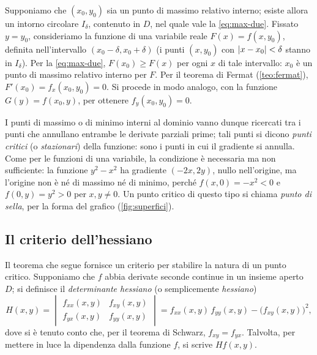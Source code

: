 \begin{dimostrazione}
Supponiamo che $(x_{0},y_{0})$ sia un punto di massimo relativo interno; esiste allora un
intorno circolare $I_{\delta}$, contenuto in $D$, nel quale vale la \eqref{eq:max-due}.
Fissato $y=y_{0}$, consideriamo la funzione di una variabile reale
$F(x)=f(x,y_{0})$, definita nell'intervallo $(x_{0}-\delta,x_{0}+\delta)$ (i punti
$(x,y_{0})$ con $\lvert x-x_{0}\rvert<\delta$ stanno in $I_{\delta}$). Per la \eqref{eq:max-due},
$F(x_{0})\ge F(x)$ per ogni $x$ di tale intervallo: $x_{0}$ è un punto di massimo
relativo interno per $F$. Per il teorema di Fermat (\cref{teo:fermat}),
$F'(x_{0})=f_{x}(x_{0},y_{0})=0$. Si procede in modo analogo, con la funzione
$G(y)=f(x_{0},y)$, per ottenere $f_{y}(x_{0},y_{0})=0$.
\end{dimostrazione}

I punti di massimo o di minimo interni al dominio vanno dunque ricercati tra i punti che
annullano entrambe le derivate parziali prime; tali punti si dicono \emph{punti critici}
(o \emph{stazionari}) della funzione: sono i punti in cui il gradiente si annulla. Come
per le funzioni di una variabile, la condizione è necessaria ma non sufficiente: la
funzione $y^{2}-x^{2}$ ha gradiente $(-2x,2y)$, nullo nell'origine, ma l'origine non è né
di massimo né di minimo, perché $f(x,0)=-x^{2}<0$ e $f(0,y)=y^{2}>0$ per $x,y\neq0$. Un
punto critico di questo tipo si chiama \emph{punto di sella}, per la forma del grafico
(\cref{fig:superfici}).

\subsection{Il criterio dell'hessiano}

Il teorema che segue fornisce un criterio per stabilire la natura di un punto critico.
Supponiamo che $f$ abbia derivate seconde continue in un insieme aperto $D$; si definisce
il \emph{determinante hessiano} (o semplicemente \emph{hessiano})
\begin{equation}\label{eq:hessiano}
  H(x,y)=\begin{vmatrix} f_{xx}(x,y) & f_{xy}(x,y)\\ f_{yx}(x,y) & f_{yy}(x,y)\end{vmatrix}
  =f_{xx}(x,y)\,f_{yy}(x,y)-\bigl(f_{xy}(x,y)\bigr)^{2},
\end{equation}
dove si è tenuto conto che, per il teorema di Schwarz, $f_{xy}=f_{yx}$. Talvolta, per
mettere in luce la dipendenza dalla funzione $f$, si scrive $Hf(x,y)$.

